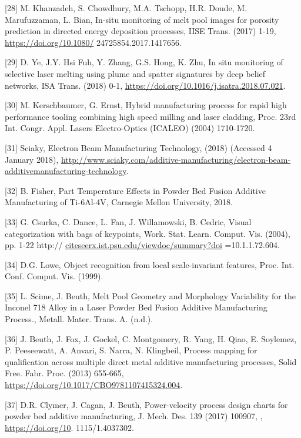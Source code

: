 \documentclass[10pt]{article}
\begin{document}
[28] M. Khanzadeh, S. Chowdhury, M.A. Tschopp, H.R. Doude, M. Marufuzzaman, L. Bian, In-situ monitoring of melt pool images for porosity prediction in directed energy deposition processes, IISE Trans. (2017) 1-19, \href{https://doi.org/10.1080/}{https://doi.org/10.1080/} 24725854.2017.1417656.

[29] D. Ye, J.Y. Hsi Fuh, Y. Zhang, G.S. Hong, K. Zhu, In situ monitoring of selective laser melting using plume and spatter signatures by deep belief networks, ISA Trans. (2018) 0-1, \href{https://doi.org/10.1016/j.isatra.2018.07.021}{https://doi.org/10.1016/j.isatra.2018.07.021}.

[30] M. Kerschbaumer, G. Ernst, Hybrid manufacturing process for rapid high performance tooling combining high speed milling and laser cladding, Proc. 23rd Int. Congr. Appl. Lasers Electro-Optics (ICALEO) (2004) 1710-1720.

[31] Sciaky, Electron Beam Manufacturing Technology, (2018) (Accessed 4 January 2018), \href{http://www.sciaky.com/additive-manufacturing/electron-beam-additivemanufacturing-technology}{http://www.sciaky.com/additive-manufacturing/electron-beam-additivemanufacturing-technology}.

[32] B. Fisher, Part Temperature Effects in Powder Bed Fusion Additive Manufacturing of Ti-6Al-4V, Carnegie Mellon University, 2018.

[33] G. Csurka, C. Dance, L. Fan, J. Willamowski, B. Cedric, Visual categorization with bags of keypoints, Work. Stat. Learn. Comput. Vis. (2004), pp. 1-22 http:// \href{http://citeseerx.ist.psu.edu/viewdoc/summary?doi}{citeseerx.ist.psu.edu/viewdoc/summary?doi} =10.1.1.72.604.

[34] D.G. Lowe, Object recognition from local scale-invariant features, Proc. Int. Conf. Comput. Vis. (1999).

[35] L. Scime, J. Beuth, Melt Pool Geometry and Morphology Variability for the Inconel 718 Alloy in a Laser Powder Bed Fusion Additive Manufacturing Process., Metall. Mater. Trans. A. (n.d.).

[36] J. Beuth, J. Fox, J. Gockel, C. Montgomery, R. Yang, H. Qiao, E. Soylemez, P. Peeseewatt, A. Anvari, S. Narra, N. Klingbeil, Process mapping for qualification across multiple direct metal additive manufacturing processes, Solid Free. Fabr. Proc. (2013) 655-665, \href{https://doi.org/10.1017/CBO9781107415324.004}{https://doi.org/10.1017/CBO9781107415324.004}.

[37] D.R. Clymer, J. Cagan, J. Beuth, Power-velocity process design charts for powder bed additive manufacturing, J. Mech. Des. 139 (2017) 100907, , \href{https://doi.org/10}{https://doi.org/10}. 1115/1.4037302.
\end{document}

